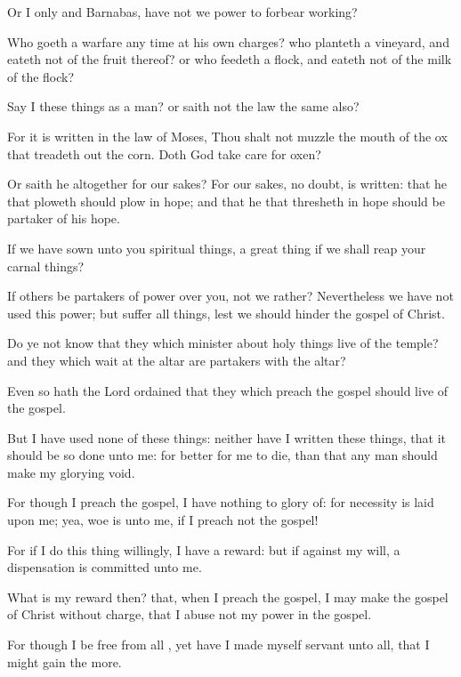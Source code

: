 {Or
I
only
and
Barnabas,
have
not we
power to forbear
working?

Who goeth a
warfare any
time at his
own
charges?
who
planteth a
vineyard,
and
eateth
not
of the
fruit
thereof?
or
who
feedeth a
flock,
and
eateth
not
of the
milk of the
flock?

Say
I these
things
as a
man?
or
saith
not the
law the
same
also?

For it is
written
in the
law of
Moses, Thou
shalt
not muzzle the mouth
of the
ox that treadeth out the
corn.
Doth
God take
care for
oxen?

Or saith
he
{}
altogether
for our
sakes?
For our
sakes, no
doubt,
{} is
written:
that
he that
ploweth
should
plow
in
hope; and
that he
that
thresheth
in
hope should be
partaker of
his
hope.

If
we have
sown unto
you spiritual
things,
{} a great
thing
if
we shall
reap
your carnal
things?

If
others be
partakers of
{}
power over
you,
{}
not
we
rather?
Nevertheless we
have
not
used
this
power;
but
suffer all
things,
lest we
should
hinder the
gospel of
Christ.

Do
ye
not
know
that
they which
minister about holy
things
live
{}
of the
temple? and they which
wait at the
altar are
partakers with the
altar?

Even
so
hath the
Lord ordained
that they
which
preach the
gospel should
live
of the
gospel.

But
I have
used
none of these
things:
neither have I
written these
things,
that it should
be
so
done
unto
me:
for
{}
better for
me to
die,
than
that any
man should
make
my
glorying
void.

For
though I preach the
gospel,
I
have
nothing to glory
of:
for
necessity is
laid upon
me;
yea,
woe
is unto
me,
if I
preach
not the
gospel!

For
if I
do this
thing
willingly, I
have a
reward:
but
if against my
will, a
dispensation
{} is committed unto
me.

What
is
my
reward
then?
{}
that, when I preach the
gospel, I may
make the
gospel of
Christ without
charge, that I
abuse
not
my
power
in the
gospel.

For though I
be
free
from
all
{}, yet have I
made
myself
servant unto
all,
that I might
gain the
more.

}

